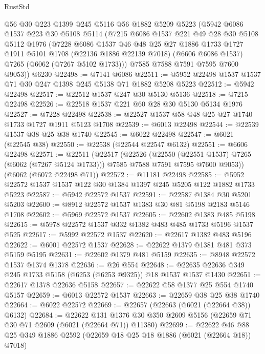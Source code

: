 \begin{lexlean}{RustStd}
\begin{coremodule}
    @56
    @30
    @223
    @1399
    @245
    @5116
    @56
    @1882
    @5209
    @5223
    (@5942
      @6086
      @1537
      @223
      @30
      @5108
      @5114
      (@7215
        @6086
        @1537
        @221
        @49
        @28
        @30
        @5108
        @5112
        @1976
        (@7228
          @6086
          @1537
          @46
          @48
          @25
          @27
          @1886
          @1733
          @1727
          @1911
          @5101
          @1708
          (@22136 @1886 @22139 @7018)
          (@6606 @6086 @1537)
          @7265
          (@6062 (@7267 @5102 @1733)))
        @7585
        @7588
        @7591
        @7595
        @7600
        @9053))
    @6230
@22498 := @7141 @6086
@22511 := @5952 @22498 @1537 @1537 @71 @30 @247 @1398 @245 @5138 @71 @1882 @5208 @5223
@22512 := @5942 @22498
@22517 := @22512 @1537 @247 @30 @5130 @5136
@22518 := @7215 @22498
@22526 := @22518 @1537 @221 @60 @28 @30 @5130 @5134 @1976
@22527 := @7228 @22498
@22538 := @22527 @1537 @58 @48 @25 @27 @1740 @1733 @1727 @1911 @5123 @1708
@22539 := @6013 @22498
@22544 := @22539 @1537 @38 @25 @38 @1740
@22545 := @6022 @22498
@22547 := @6021 (@22545 @38)
@22550 := @22538 (@22544 @22547 @6132)
@22551 := @6606 @22498
@22571 := @22511
    (@22517
      (@22526
        (@22550 (@22551 @1537) @7265 (@6062 (@7267 @5124 @1733)))
        @7585
        @7588
        @7591
        @7595
        @7600
        @9053))
    (@6062 (@6072 @22498 @71))
@22572 := @11181 @22498
@22585 := @5952 @22572 @1537 @1537 @122 @30 @1384 @1397 @245 @5205 @122 @1882 @1733 @5223
@22587 := @5942 @22572 @1537
@22591 := @22587 @1384 @30 @5201 @5203
@22600 := @8912 @22572 @1537 @1383 @30 @81 @5198 @2183 @5146 @1708
@22602 := @5969 @22572 @1537
@22605 := @22602 @1383 @485 @5198
@22615 := @5978 @22572 @1537 @332 @1382 @483 @485 @1733 @5196 @1537 @525
@22617 := @5992 @22572 @1537
@22620 := @22617 @1382 @483 @5196
@22622 := @6001 @22572 @1537
@22628 := @22622 @1379 @1381 @481 @373 @5159 @5195
@22631 := @22602 @1379 @481 @5159
@22635 := @8948 @22572 @1537 @1374 @1378
@22636 := @26 @554
@22648 := @22635 @22636 @349 @245 @1733 @5158 (@6253 (@6253 @9325)) @18 @1537 @1537 @1430
@22651 := @22617 @1378 @22636 @5158
@22657 := @22622 @58 @1377 @25 @554 @1740 @5157
@22659 := @6013 @22572 @1537
@22663 := @22659 @38 @25 @38 @1740
@22664 := @6022 @22572
@22669 := @22657 (@22663 (@6021 (@22664 @38)) @6132)
@22684 := @22622
    @131
    @1376
    @30
    @350
    @2609
    @5156
    (@22659 @71 @30 @71 @2609 (@6021 (@22664 @71)) @11380)
@22699 := @22622 @46 @88 @25 @349 @1886 @2592 (@22659 @18 @25 @18 @1886 (@6021 (@22664 @18)) @7018)

\end{coremodule}
\end{lexlean}
